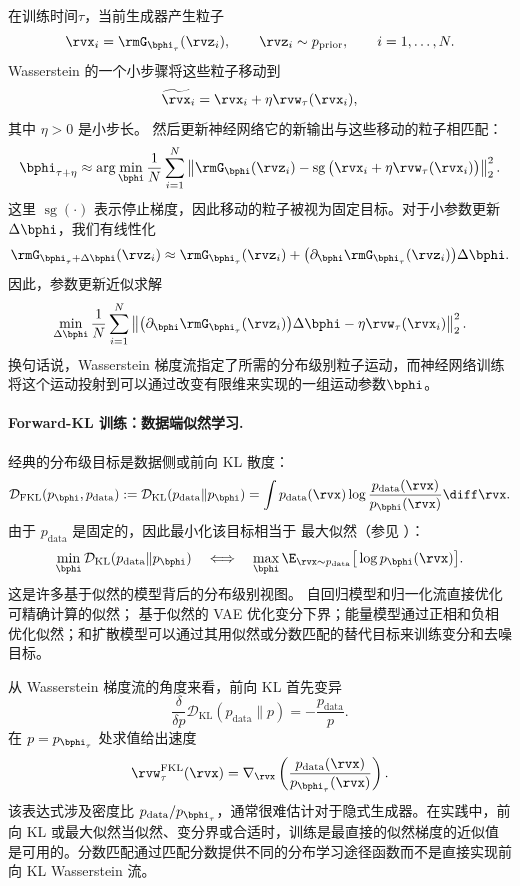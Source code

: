 在训练时间$\tau$，当前生成器产生粒子
\[
    \rvx_i
    =
    \rmG_{\bphi_\tau}(\rvz_i),
    \qquad
    \rvz_i\sim p_{\mathrm{prior}},
    \qquad
    i=1,\ldots,N.
\]
Wasserstein 的一个小步骤将这些粒子移动到
\[
    \widetilde{\rvx}_i
    =
    \rvx_i+\eta\rvw_\tau(\rvx_i),
\]
其中 $\eta>0$ 是小步长。  然后更新神经网络它的新输出与这些移动的粒子相匹配：
\[
    \bphi_{\tau+\eta}
    \approx
    \arg\min_{\bphi}
    \frac{1}{N}
    \sum_{i=1}^N
    \left\|
        \rmG_{\bphi}(\rvz_i)
        -
        \operatorname{sg}
        \big(
            \rvx_i+\eta\rvw_\tau(\rvx_i)
        \big)
    \right\|_2^2.
\]
这里 $\operatorname{sg}(\cdot)$ 表示停止梯度，因此移动的粒子被视为固定目标。对于小参数更新 $\Delta\bphi$，我们有线性化
\[
    \rmG_{\bphi_\tau+\Delta\bphi}(\rvz_i)
    \approx
    \rmG_{\bphi_\tau}(\rvz_i)
    +
    \big(\partial_{\bphi}\rmG_{\bphi_\tau}(\rvz_i)\big)\Delta\bphi.
\]
因此，参数更新近似求解
\[
    \min_{\Delta\bphi}
    \frac{1}{N}
    \sum_{i=1}^N
    \left\|
        \big(\partial_{\bphi}\rmG_{\bphi_\tau}(\rvz_i)\big)\Delta\bphi
        -
        \eta\rvw_\tau(\rvx_i)
    \right\|_2^2.
\]
换句话说，Wasserstein 梯度流指定了所需的分布级别粒子运动，而神经网络训练将这个运动投射到可以通过改变有限维来实现的一组运动参数$\bphi$。

\paragraph{Forward-KL 训练：数据端似然学习.}
经典的分布级目标是数据侧或前向 KL
散度：
\[
    \mathcal{D}_{\mathrm{FKL}}(p_{\bphi},p_{\mathrm{data}})
    :=
    \mathcal D_{\mathrm{KL}}(p_{\mathrm{data}}\|p_{\bphi})
    =
    \int
    p_{\mathrm{data}}(\rvx)
    \log
    \frac{p_{\mathrm{data}}(\rvx)}{p_{\bphi}(\rvx)}
    \diff\rvx.
\]
由于 $p_{\mathrm{data}}$ 是固定的，因此最小化该目标相当于
最大似然（参见 ）：
\[
    \min_{\bphi}
    \mathcal D_{\mathrm{KL}}(p_{\mathrm{data}}\|p_{\bphi})
    \quad
    \Longleftrightarrow
    \quad
    \max_{\bphi}
    \E_{\rvx\sim p_{\mathrm{data}}}
    \big[
        \log p_{\bphi}(\rvx)
    \big].
\]
这是许多基于似然的模型背后的分布级别视图。
自回归模型和归一化流直接优化可精确计算的似然；
基于似然的 VAE 优化变分下界；能量模型通过正相和负相优化似然；和扩散模型可以通过其用似然或分数匹配的替代目标来训练变分和去噪目标。

从 Wasserstein 梯度流的角度来看，前向 KL 首先变异
\[
    \frac{\delta}{\delta p}
    \mathcal D_{\mathrm{KL}}(p_{\mathrm{data}}\|p)
    =
    -
    \frac{p_{\mathrm{data}}}{p}.
\]
在 $p=p_{\bphi_\tau}$ 处求值给出速度
\[
    \rvw_\tau^{\mathrm{FKL}}(\rvx)
    =
    \nabla_{\rvx}
    \left(
        \frac{p_{\mathrm{data}}(\rvx)}
             {p_{\bphi_\tau}(\rvx)}
    \right).
\]
该表达式涉及密度比
$p_{\mathrm{data}}/p_{\bphi_\tau}$，通常很难估计对于隐式生成器。在实践中，前向 KL 或最大似然当似然、变分界或合适时，训练是最直接的似然梯度的近似值是可用的。分数匹配通过匹配分数提供不同的分布学习途径函数而不是直接实现前向 KL Wasserstein 流。

